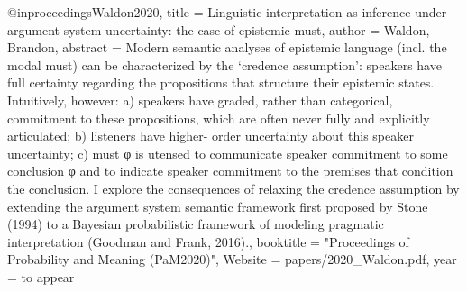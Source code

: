 {@inproceedings{Waldon2020,
    title = {{Linguistic interpretation as inference under argument system uncertainty: the case of epistemic must}},
    author = {Waldon, Brandon},
    abstract = {Modern semantic analyses of epistemic language (incl. the modal must) can be characterized by the ‘credence assumption’: speakers have full certainty regarding the propositions that structure their epistemic states. Intuitively, however: a) speakers have graded, rather than categorical, commitment to these propositions, which are often never fully and explicitly articulated; b) listeners have higher- order uncertainty about this speaker uncertainty; c) must φ is utensed to communicate speaker commitment to some conclusion φ and to indicate speaker commitment to the premises that condition the conclusion. I explore the consequences of relaxing the credence assumption by extending the argument system semantic framework first proposed by Stone (1994) to a Bayesian probabilistic framework of modeling pragmatic interpretation (Goodman and Frank, 2016).},
    booktitle = "Proceedings of Probability and Meaning (PaM2020)",
    Website = {papers/2020_Waldon.pdf},
    year = {to appear}
}

}
